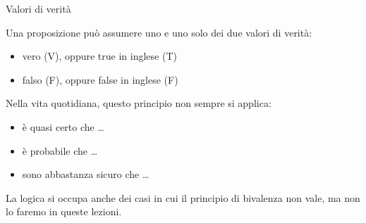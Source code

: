 \documentclass[10pt,dvipsnames,handout]{beamer}
\begin{document}
\begin{frame}{Valori di verità}
	\begin{definition}
		Una proposizione può assumere uno e uno solo dei due \alert{valori di verità}:
		\begin{itemize}
			\item vero (\alert{V}), oppure true in inglese (\alert{T})
			\item falso (\alert{F}), oppure false in inglese (\alert{F})
		\end{itemize}
	\end{definition}
	Nella vita quotidiana, questo principio non sempre si applica:
	\begin{itemize}
		\item è quasi certo che \ldots
		\item è probabile che \ldots
		\item sono abbastanza sicuro che \ldots
	\end{itemize}
	La logica si occupa anche dei casi in cui il principio di bivalenza non vale, ma non lo faremo in queste lezioni.
\end{frame}

%
%
%
\end{document}
